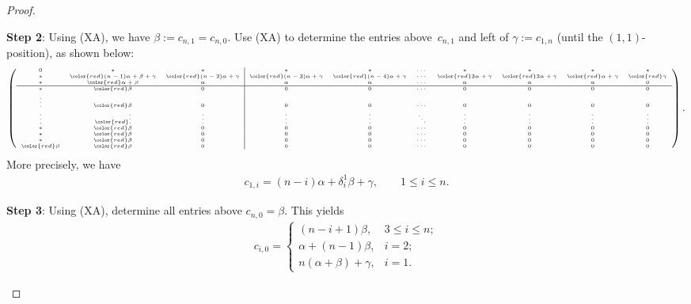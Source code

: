 \documentclass[pdftex]{sigma}%
\newcommand\rbeta{{\color{red}\beta}}
\newcommand\rgamma{{\color{red}\gamma}}
\numberwithin{equation}{section}
\begin{document}
\begin{proof}
\begin{itemize}
{\bf Step 2}: Using (XA), we have $\beta := c_{n,1} = c_{n,0}$. Use (XA) to determine the entries above~$c_{n,1}$ and left of $\gamma := c_{1,n}$ (until the $(1,1)$-position), as shown below:
\begin{align*}
\begin{tiny}
\left( \begin{array}{ccc|cccccccc}
0 & * & * & * & * & \cdots & * & * & * & *\\
* & {\color{red} (n-1)\alpha + \beta + \gamma} & {\color{red} (n-2)\alpha + \gamma} & {\color{red} (n-3)\alpha + \gamma} & {\color{red} (n-4)\alpha + \gamma} & \cdots & {\color{red} 3\alpha + \gamma} & {\color{red} 2\alpha + \gamma} & {\color{red} \alpha + \gamma} & \rgamma\\
* & {\color{red} \alpha + \beta} & \alpha & \alpha & \alpha & \cdots & \alpha & \alpha & \alpha & 0\\ \hline
* & \rbeta & 0 & 0 & 0 & \cdots & 0 & 0 & 0 & 0\\
\vdots & {\color{red} \beta} & 0 & 0 & 0 & \cdots & 0 & 0 & 0 & 0\\
\vdots & {\color{red} \vdots} & \vdots & \vdots & \vdots & \ddots & \vdots & \vdots & \vdots & \vdots\\
* & \rbeta & 0 & 0 & 0 & \cdots & 0 & 0 & 0 & 0\\
* & \rbeta & 0 & 0 & 0 & \cdots & 0 & 0 & 0 & 0\\
* & \rbeta & 0 & 0 & 0 & \cdots & 0 & 0 & 0 & 0\\
\rbeta & \rbeta & 0 & 0 & 0 & \cdots & 0 & 0 & 0 & 0
\end{array} \right).
\end{tiny}
\end{align*}
More precisely, we have
\begin{align} \label{E:c1i}
c_{1,i} =
(n-i)\alpha + \delta_i^1\beta + \gamma, \qquad 1 \leq i \leq n.
\end{align}
	
{\bf Step 3}: Using (XA), determine all entries above $c_{n,0} = \beta$. This yields
\begin{align}\label{E:ci0}
c_{i,0} = \begin{cases}
(n-i+1)\beta, & 3 \leq i \leq n;\\
\alpha + (n-1)\beta, & i=2;\\
n(\alpha + \beta) + \gamma, & i=1.
\end{cases}
\end{align}
	

\end{itemize}
\end{proof}
\end{document}

